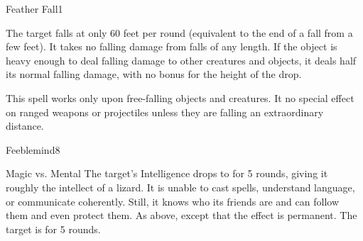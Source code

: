 \begin{spellsection}{Feather Fall}{1}
    \begin{spellheader}
    \end{spellheader}
    \begin{spellcontent}
        \begin{spelltargetinginfo}
        \end{spelltargetinginfo}
        \begin{spelleffects}
            \spelleffect The target falls at only 60 feet per round (equivalent to the end of a fall from a few feet). It takes no falling damage from falls of any length. If the object is heavy enough to deal falling damage to other creatures and objects, it deals half its normal falling damage, with no bonus for the height of the drop.
            \spelldur \durshort
        \end{spelleffects}
    \end{spellcontent}
    \begin{spellfooter}
        \spellnotes This spell works only upon free-falling objects and creatures. It no special effect on ranged weapons or projectiles unless they are falling an extraordinary distance.
        \miscastrandom
    \end{spellfooter}
\end{spellsection}

\begin{spellsection}{Feeblemind}{8}
    \begin{spellheader}
    \end{spellheader}
    \begin{spellcontent}
        \begin{spelltargetinginfo}
        \end{spelltargetinginfo}
        \begin{spelleffects}
            \begin{spellattack}{Magic vs. Mental}
                \spellsuccess The target's Intelligence drops to  for 5 rounds, giving it roughly the intellect of a lizard. It is unable to cast spells, understand language, or communicate coherently. Still, it knows who its friends are and can follow them and even protect them.
                \spellcritical As above, except that the effect is permanent.
                \spellfailure The target is \dazed for 5 rounds.
            \end{spellattack}
        \end{spelleffects}
    \end{spellcontent}
    \begin{spellfooter}
        \miscastrandom
    \end{spellfooter}
\end{spellsection}

